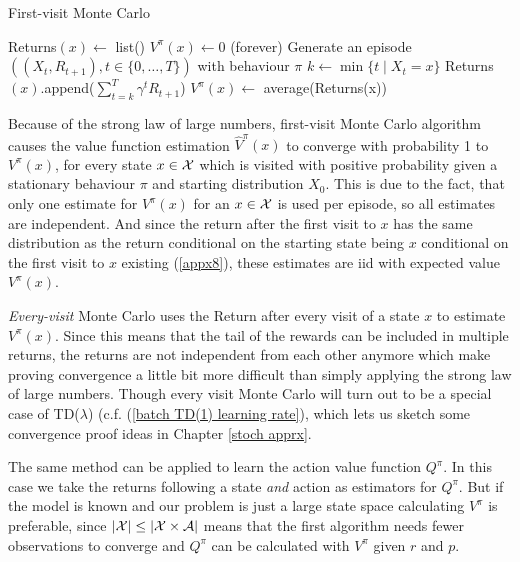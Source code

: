 \begin{algorithm}
	\caption{First-visit Monte Carlo}
	\begin{algorithmic}[1]
		 
			\State Returns\((x)\gets\) list()
			\State \(V^\pi(x)\gets 0\)
		\EndFor
		 (forever) 
			\State Generate an episode \(((X_t,R_{t+1}), t\in\{0,\dots,T\})\) with behaviour \(\pi\)
				\State \(k\gets \min\{t \mid X_t=x\}\)
				\State Returns\((x)\).append(\(\sum_{t=k}^T\gamma^tR_{t+1}\))
				\State \(V^\pi(x)\gets\) average(Returns(x))
			\EndFor
		\EndWhile
	\end{algorithmic}
\end{algorithm}

Because of the strong law of large numbers, first-visit Monte Carlo algorithm causes the value function estimation \(\hat{V}^\pi(x)\) to converge with probability 1 to \(V^\pi(x)\), for every state \(x\in\mathcal{X}\) which is visited with positive probability given a stationary behaviour \(\pi\) and starting distribution \(X_0\). This is due to the fact, that only one estimate for \(V^\pi(x)\) for an \(x\in\mathcal{X}\) is used per episode, so all estimates are independent. And since the return after the first visit to \(x\) has the same distribution as the return conditional on the starting state being \(x\) conditional on the first visit to \(x\) existing (\ref{appx8}), these estimates are iid with expected value \(V^\pi(x)\).

\emph{Every-visit} Monte Carlo uses the Return after every visit of a state \(x\) to estimate \(V^\pi(x)\). Since this means that the tail of the rewards can be included in multiple returns, the returns are not independent from each other anymore which make proving convergence a little bit more difficult than simply applying the strong law of large numbers. Though every visit Monte Carlo will turn out to be a special case of TD(\(\lambda\)) (c.f. (\ref{batch TD(1) learning rate}), which lets us sketch some convergence proof ideas in Chapter \ref{stoch apprx}.

The same method can be applied to learn the action value function \(Q^\pi\). In this case we take the returns following a state \emph{and} action as estimators for \(Q^\pi\). But if the model is known and our problem is just a large state space calculating \(V^\pi\) is preferable, since \(|\mathcal{X}|\le |\mathcal{X}\times\mathcal{A}|\) means that the first algorithm needs fewer observations to converge and \(Q^\pi\) can be calculated with \(V^\pi\) given \(r\) and \(p\).

